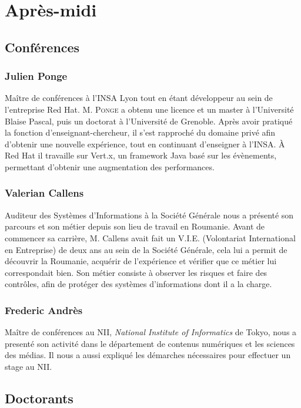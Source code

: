 \documentclass[14pt, a4paper]{report}
\begin{document}
\section{Après-midi}

\subsection{Conférences}

\subsubsection{Julien Ponge} Maître de conférences à l'INSA Lyon tout en étant développeur au sein de l'entreprise Red Hat. M. \textsc{Ponge} a obtenu une licence et un master à l'Université Blaise Pascal, puis un doctorat à l'Université de Grenoble. Après avoir pratiqué la fonction d'enseignant-chercheur, il s'est rapproché du domaine privé afin d'obtenir une nouvelle expérience, tout en continuant d'enseigner à l'INSA. À Red Hat il travaille sur Vert.x, un framework Java basé sur les évènements, permettant d'obtenir une augmentation des performances.

\subsubsection{Valerian Callens} Auditeur des Systèmes d'Informations à la Société Générale nous a présenté son parcours et son métier depuis son lieu de travail en Roumanie. Avant de commencer sa carrière, M. Callens avait fait un V.I.E. (Volontariat International en Entreprise) de deux ans au sein de la Société Générale, cela lui a permit de découvrir la Roumanie, acquérir de l'expérience et vérifier que ce métier lui correspondait bien. Son métier consiste à observer les risques et faire des contrôles, afin de protéger des systèmes d'informations dont il a la charge.

\subsubsection{Frederic Andrès} Maître de conférences au NII, \emph{National Institute of Informatics} de Tokyo, nous a presenté son activité dans le département de contenus numériques et les sciences des médias. Il nous a aussi expliqué les démarches nécessaires pour effectuer un stage au NII.


\subsection{Doctorants}
\end{document}
